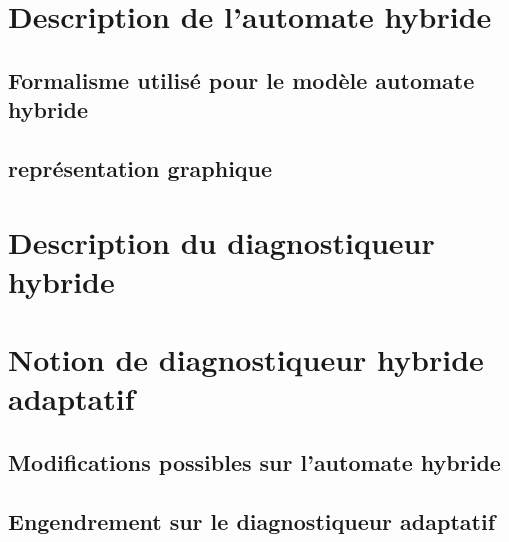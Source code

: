 \documentclass{article}
\begin{document}
\section{Description de l'automate hybride}

\subsection{Formalisme utilis\'e pour le mod\`ele automate hybride}

\subsection{repr\'esentation graphique}

\section{Description du diagnostiqueur hybride}

\section{Notion de diagnostiqueur hybride adaptatif}

\subsection{Modifications possibles sur l'automate hybride}

\subsection{Engendrement sur le diagnostiqueur adaptatif}
\end{document}

